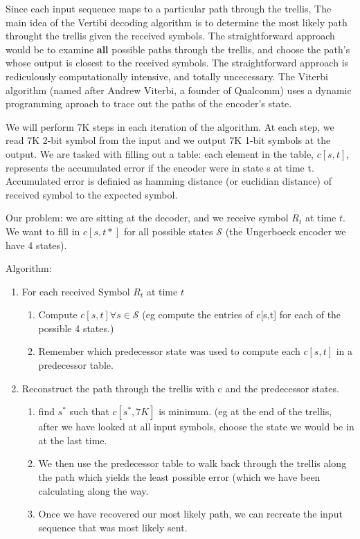 Since each input sequence maps to a particular path through the trellis,
The main idea of the Vertibi decoding algorithm is to determine the most
likely path throught the trellis given the received symbols. The straightforward
approach would be to examine \textbf{all} possible paths through the trellis, and
choose the path's whose output is closest to the received symbols. The
straightforward approach is rediculously computationally intensive, 
and totally uncecessary. The Viterbi algorithm (named after Andrew Viterbi, a founder of Qualcomm)
uses a dynamic programming aproach to trace out the paths of the encoder's state. 

We will perform 7K steps in each iteration of the algorithm. 
At each step, we read 7K 2-bit symbol
from the input and we output 7K 1-bit symbols at the output. 
We are tasked with filling out a table: each element in the table, $c[s,t]$, 
represents the accumulated error if the encoder were in state s at time t. 
Accumulated error is definied as hamming distance
(or euclidian distance) of received symbol to the expected symbol.

Our problem: we are sitting at the decoder, and we receive symbol $R_t$ at time $t$. We want to fill in 
$c[s,t*]$ for all possible states $\mathcal{S}$ (the Ungerboeck encoder we have 4 states).

Algorithm:
\begin{enumerate}
\item For each received Symbol $R_t$ at time $t$
	\begin{enumerate}
	\item Compute $c[s,t] \forall s \in \mathcal{S}$ (eg compute the entries
 	       of c[s,t] for each of the possible 4 states.)
	\item Remember which predecessor state was used to compute each $c[s,t]$ in
	       a predecessor table.
	\end{enumerate}
\item Reconstruct the path through the trellis with c and the predecessor states.
	\begin{enumerate}
	\item find $s^*$ such that $c[s^*,7K]$ is minimum. (eg at the end of the trellis, 
	       after we have looked at all input symbols, choose the state we would 
	       be in at the last time. 
	\item We then use the predecessor table to walk back through the trellis
	       along the path which yields the least possible error (which we have 
	       been calculating along the way.
	\item Once we have recovered our most likely path, we can recreate the
	       input sequence that was most likely sent.
	\end{enumerate} 
\end{enumerate}

